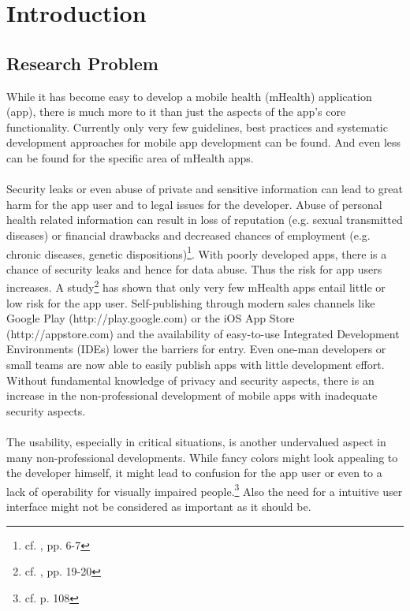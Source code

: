 \section{Introduction}

\subsection{Research Problem}
While it has become easy to develop a mobile health (mHealth) application (app), there is much more to it than just the aspects of the app's core functionality. Currently only very few guidelines, best practices and systematic development approaches for mobile app development can be found. And even less can be found for the specific area of mHealth apps.
\\
\\
Security leaks or even abuse of private and sensitive information can lead to great harm for the app user and to legal issues for the developer. Abuse of personal health related information can result in loss of reputation (e.g. sexual transmitted diseases) or financial drawbacks and decreased chances of employment (e.g. chronic diseases, genetic dispositions)\footnote{cf. \cite{Dehling.2013}, pp. 6-7}. With poorly developed apps, there is a chance of security leaks and hence for data abuse. Thus the risk for app users increases. A study\footnote{cf. \cite{Njie.2013}, pp. 19-20} has shown that only very few mHealth apps entail little or low risk for the app user. Self-publishing through modern sales channels like Google Play (http://play.google.com) or the iOS App Store (http://appstore.com) and the availability of easy-to-use Integrated Development Environments (IDEs) lower the barriers for entry. Even one-man developers or small teams are now able to easily publish apps with little development effort. Without fundamental knowledge of privacy and security aspects, there is an increase in the non-professional development of mobile apps with inadequate security aspects.
\\
\\
The usability, especially in critical situations, is another undervalued aspect in many non-professional developments. While fancy colors might look appealing to the developer himself, it might lead to confusion for the app user or even to a lack of operability for visually impaired people.\footnote{cf. \cite{Badashian.2008} p. 108} Also the need for a intuitive user interface might not be considered as important as it should be.
\\
